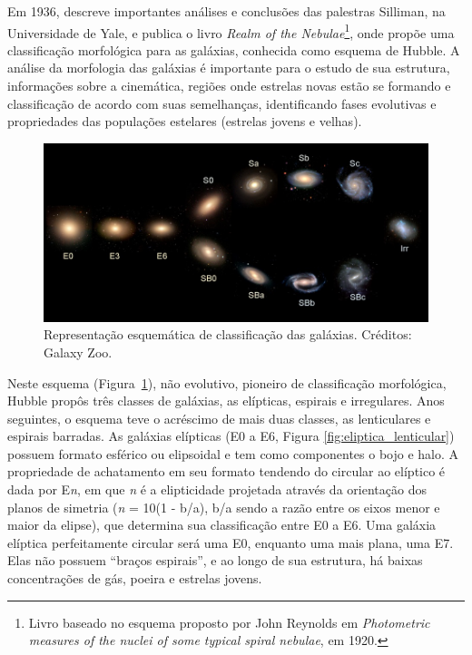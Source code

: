 Em 1936,  descreve importantes análises e conclusões das palestras Silliman, na Universidade de Yale, e publica o livro \emph{Realm of the Nebulae}\footnote{Livro baseado no esquema proposto por John Reynolds em \emph{Photometric measures of the nuclei of some typical spiral nebulae}, em 1920.}, onde propõe uma classificação morfológica para as galáxias, conhecida como esquema de Hubble. A análise da morfologia das galáxias é importante para o estudo de sua estrutura, informações sobre a cinemática, regiões onde estrelas novas estão se formando e classificação de acordo com suas semelhanças, identificando fases evolutivas e propriedades das populações estelares (estrelas jovens e velhas).

\begin{figure}[!h]
  \centering 
  \includegraphics[width=1.0\textwidth]{Imagens/HubbleTuningFork.jpg} 
  \caption[Esquema de Hubble de classificação de galáxias.]{Representação esquemática de classificação das galáxias. Créditos: Galaxy Zoo.} 
  \label{fig:esquema_hubble} 
\end{figure}

Neste esquema (Figura~\ref{fig:esquema_hubble}), não evolutivo, pioneiro de classificação morfológica, Hubble propôs três classes de galáxias, as elípticas, espirais e irregulares. Anos seguintes, o esquema teve o acréscimo de mais duas classes, as lenticulares e espirais barradas. As galáxias elípticas (E0 a E6, Figura \ref{fig:eliptica_lenticular}) possuem formato esférico ou elipsoidal e tem como componentes o bojo e halo. A propriedade de achatamento em seu formato tendendo do circular ao elíptico é dada por E\emph{n}, em que \emph{n} é a elipticidade projetada através da orientação dos planos de simetria (\emph{n} = 10(1 - b/a), b/a sendo a razão entre os eixos menor e maior da elipse), que determina sua classificação entre E0 a E6. Uma galáxia elíptica perfeitamente circular será uma E0, enquanto uma mais plana, uma E7. Elas não possuem ``braços espirais'', e ao longo de sua estrutura, há baixas concentrações de gás, poeira e estrelas jovens.

